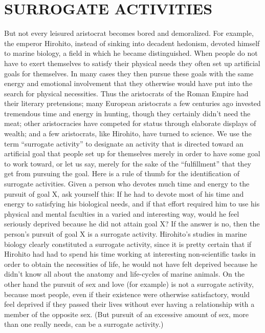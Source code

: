 \chapter{SURROGATE ACTIVITIES}

 But not every leisured aristocrat becomes bored and demoralized. For example, the emperor Hirohito, instead of sinking into decadent hedonism, devoted himself to marine biology, a field in which he became distinguished. When people do not have to exert themselves to satisfy their physical needs they often set up artificial goals for themselves. In many cases they then pursue these goals with the same energy and emotional involvement that they otherwise would have put into the search for physical necessities. Thus the aristocrats of the Roman Empire had their literary pretensions; many European aristocrats a few centuries ago invested tremendous time and energy in hunting, though they certainly didn’t need the meat; other aristocracies have competed for status through elaborate displays of wealth; and a few aristocrats, like Hirohito, have turned to science.
 We use the term “surrogate activity” to designate an activity that is directed toward an artificial goal that people set up for themselves merely in order to have some goal to work toward, or let us say, merely for the sake of the “fulfillment” that they get from pursuing the goal. Here is a rule of thumb for the identification of surrogate activities. Given a person who devotes much time and energy to the pursuit of goal X, ask yourself this: If he had to devote most of his time and energy to satisfying his biological needs, and if that effort required him to use his physical and mental faculties in a varied and interesting way, would he feel seriously deprived because he did not attain goal X? If the answer is no, then the person’s pursuit of goal X is a surrogate activity. Hirohito’s studies in marine biology clearly constituted a surrogate activity, since it is pretty certain that if Hirohito had had to spend his time working at interesting non-scientific tasks in order to obtain the necessities of life, he would not have felt deprived because he didn’t know all about the anatomy and life-cycles of marine animals. On the other hand the pursuit of sex and love (for example) is not a surrogate activity, because most people, even if their existence were otherwise satisfactory, would feel deprived if they passed their lives without ever having a relationship with a member of the opposite sex. (But pursuit of an excessive amount of sex, more than one really needs, can be a surrogate activity.)
